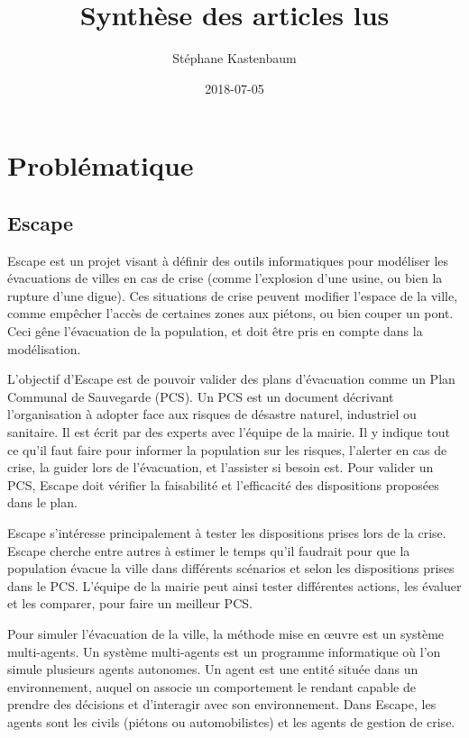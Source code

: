 \documentclass[a4paper]{article}
\title{Synthèse des articles lus}
\author{Stéphane Kastenbaum}
\date{2018-07-05}
\begin{document}
\maketitle

\section{Problématique}

\subsection{Escape}

Escape est un projet visant à définir des outils informatiques pour modéliser
les évacuations de villes en cas de crise (comme l'explosion d'une usine, ou
bien la rupture d'une digue). Ces situations de crise peuvent modifier l'espace
de la ville, comme empêcher l'accès de certaines zones aux piétons, ou bien
couper un pont. Ceci gêne l'évacuation de la population, et doit être pris en
compte dans la modélisation.

L'objectif d'Escape est de pouvoir valider des plans d'évacuation comme un Plan
Communal de Sauvegarde (PCS). Un PCS est un document décrivant l'organisation à
adopter face aux risques de désastre naturel, industriel ou sanitaire. Il est
écrit par des experts avec l'équipe de la mairie. Il y indique tout ce qu'il
faut faire pour informer la population sur les risques, l'alerter en cas de
crise, la guider lors de l'évacuation, et l'assister si besoin est. Pour
valider un PCS, Escape doit vérifier la faisabilité et l'efficacité des
dispositions proposées dans le plan.

Escape s'intéresse principalement à tester les dispositions prises lors de la
crise. Escape cherche entre autres à estimer le temps qu'il faudrait pour que la
population évacue la ville dans différents scénarios et selon les dispositions
prises dans le PCS. L'équipe de la mairie peut ainsi tester différentes actions,
les évaluer et les comparer, pour faire un meilleur PCS.

Pour simuler l'évacuation de la ville, la méthode mise en œuvre est un système
multi-agents. Un système multi-agents est un programme informatique où l'on
simule plusieurs agents autonomes. Un agent est une entité située dans un
environnement, auquel on associe un comportement le rendant capable de prendre
des décisions et d'interagir avec son environnement. Dans Escape, les agents
sont les civils (piétons ou automobilistes) et les agents de gestion de crise.
\end{document}
